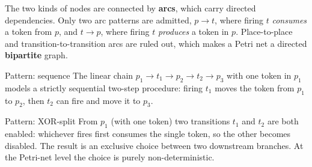 The two kinds of nodes are connected by \textbf{arcs}, which carry directed dependencies. Only two arc patterns are admitted, $p \to t$, where firing $t$ \emph{consumes} a token from $p$, and $t \to p$, where firing $t$ \emph{produces} a token in $p$. Place-to-place and transition-to-transition arcs are ruled out, which makes a Petri net a directed \textbf{bipartite} graph.

\begin{examplebox}{Pattern: sequence}
The linear chain $p_1 \to t_1 \to p_2 \to t_2 \to p_3$ with one token in $p_1$ models a strictly sequential two-step procedure: firing $t_1$ moves the token from $p_1$ to $p_2$, then $t_2$ can fire and move it to $p_3$.

\medskip
\begin{center}
\end{center}
\end{examplebox}

\begin{examplebox}{Pattern: XOR-split}
From $p_1$ (with one token) two transitions $t_1$ and $t_2$ are both enabled: whichever fires first consumes the single token, so the other becomes disabled. The result is an exclusive choice between two downstream branches. At the Petri-net level the choice is purely non-deterministic.

\medskip
\begin{center}
\end{center}
\end{examplebox}

